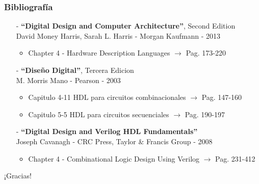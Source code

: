 \documentclass[aspectratio=169]{beamer}
\begin{document}
\begin{frame}[fragile]
    \frametitle{Bibliografía}
    \begin{itemize}
    \setlength\itemsep{0.5cm}
    \item[-] \textbf{``Digital Design and Computer Architecture''}, Second Edition\\
    David Money Harris, Sarah L. Harris - Morgan Kaufmann - 2013\\    
        \begin{itemize}
        \item Chapter 4 - Hardware Description Languages $\rightarrow$ Pag. 173-220
        \end{itemize}
    \item[-] \textbf{``Diseño Digital''}, Tercera Edicion\\
    M. Morris Mano - Pearson - 2003\\
        \begin{itemize}
        \item Capitulo 4-11 HDL para circuitos combinacionales $\rightarrow$ Pag. 147-160
        \item Capitulo 5-5 HDL para circuitos secuenciales $\rightarrow$ Pag. 190-197
        \end{itemize}
    \item[-] \textbf{``Digital Design and Verilog HDL Fundamentals''}\\
    Joseph Cavanagh - CRC Press, Taylor \& Francis Group - 2008\\
        \begin{itemize}
        \item Chapter 4 - Combinational Logic Design Using Verilog $\rightarrow$ Pag. 231-412
        \end{itemize}
    \end{itemize}
\end{frame}

\begin{frame}[plain]
    \begin{center}
    \vspace{2cm}
    \huge ¡Gracias!\\
    \vspace{2cm}
    \end{center}
\end{frame}
\end{document}
